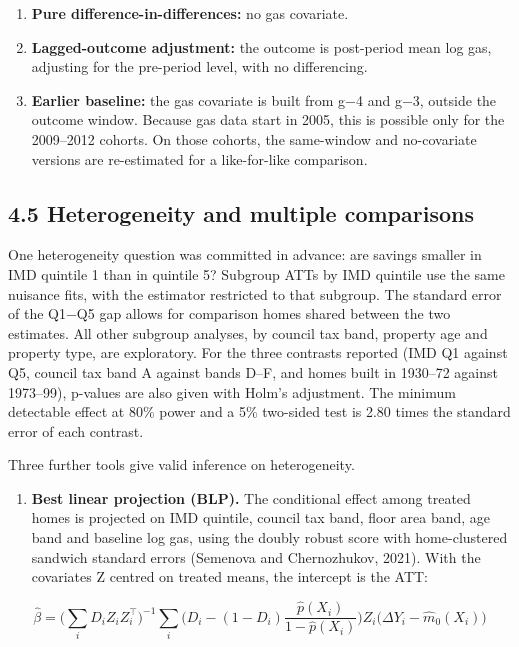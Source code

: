 \documentclass[11pt,a4paper]{article}
\providecommand{\tightlist}{\setlength{\itemsep}{0pt}\setlength{\parskip}{0pt}}
\begin{document}
\begin{enumerate}
\def\labelenumi{\arabic{enumi}.}
\tightlist
\item
  \textbf{Pure difference-in-differences:} no gas covariate.
\item
  \textbf{Lagged-outcome adjustment:} the outcome is post-period mean log gas, adjusting for the pre-period level, with no differencing.
\item
  \textbf{Earlier baseline:} the gas covariate is built from g−4 and g−3, outside the outcome window. Because gas data start in 2005, this is possible only for the 2009--2012 cohorts. On those cohorts, the same-window and no-covariate versions are re-estimated for a like-for-like comparison.
\end{enumerate}

\subsection*{4.5 Heterogeneity and multiple comparisons}

One heterogeneity question was committed in advance: are savings smaller in IMD quintile 1 than in quintile 5? Subgroup ATTs by IMD quintile use the same nuisance fits, with the estimator restricted to that subgroup. The standard error of the Q1−Q5 gap allows for comparison homes shared between the two estimates. All other subgroup analyses, by council tax band, property age and property type, are exploratory. For the three contrasts reported (IMD Q1 against Q5, council tax band A against bands D--F, and homes built in 1930--72 against 1973--99), p-values are also given with Holm's adjustment. The minimum detectable effect at 80\% power and a 5\% two-sided test is 2.80 times the standard error of each contrast.

Three further tools give valid inference on heterogeneity.

\begin{enumerate}
\def\labelenumi{\arabic{enumi}.}
\tightlist
\item
  \textbf{Best linear projection (BLP).} The conditional effect among treated homes is projected on IMD quintile, council tax band, floor area band, age band and baseline log gas, using the doubly robust score with home-clustered sandwich standard errors (Semenova and Chernozhukov, 2021). With the covariates Z centred on treated means, the intercept is the ATT:
\end{enumerate}

\[
\hat\beta = \Big(\sum_i D_i Z_i Z_i^{\top}\Big)^{-1} \sum_i \Big(D_i - (1-D_i)\frac{\hat p(X_i)}{1-\hat p(X_i)}\Big) Z_i \big(\Delta Y_i - \hat m_0(X_i)\big)
\]
\end{document}
